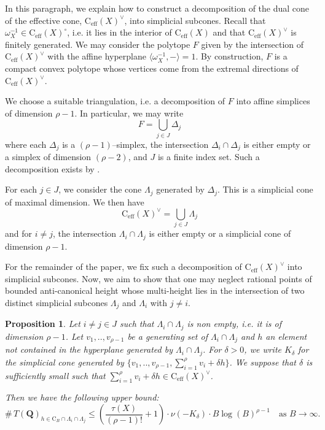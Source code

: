 \documentclass{proc-l}
\newcommand{\Q}{\mathbf{Q}}
\newcommand{\cone}{\text{C}_{\text{eff}}(X)}
\newcommand{\w}{\omega}
\newtheorem{prop}[theorem]{Proposition}
\theoremstyle{definition}
\theoremstyle{remark}
\numberwithin{equation}{section}
\begin{document}
In this paragraph, we explain how to construct a decomposition of the dual cone of the effective cone, $\cone^{\vee}$, into simplicial subcones. Recall that $\w_{X}^{-1} \in \cone^{\circ} $, i.e. it lies in the interior of $\cone$ and that $\cone^{\vee}$ is finitely generated. We may consider the polytope $F$ given by the intersection of $\cone^{\vee}$ with the affine hyperplane $\langle \w_{X}^{-1}, - \rangle = 1$. By construction, $F$ is a compact convex polytope whose vertices come from the extremal directions of $\cone^{\vee}$.

We choose a suitable triangulation, i.e. a decomposition of $F$ into affine simplices of dimension $\rho - 1$.  In particular, we may write
$$
F = \bigcup_{j \in J} \Delta_j
$$
where each $\Delta_j$ is a $(\rho-1)$–simplex, the intersection $\Delta_i \cap \Delta_j$ is either empty or a simplex of dimension $(\rho - 2)$, and $J$ is a finite index set. Such a decomposition exists by \cite[Chapter~2]{DeLoeraRambauSantosTriangulations}.

For each $j \in J$, we consider the cone $\Lambda_j$ generated by $\Delta_j$.  
This is a simplicial cone of maximal dimension.  
We then have
\begin{equation}\label{equation_decomposition_simplical_subcones}
    \cone^{\vee} = \bigcup_{j \in J} \Lambda_j
\end{equation}and for $i \neq j$, the intersection $\Lambda_i \cap \Lambda_j$ is either empty or a simplicial cone of dimension $\rho - 1$.






For the remainder of the paper, we fix such a decomposition of $\cone^{\vee}$ into simplicial subcones. Now, we aim to show that one may neglect rational points of bounded anti-canonical height whose multi-height lies in the intersection of two distinct simplicial subcones $\Lambda_j$ and $\Lambda_i$ with $j \neq i$.

\begin{prop}\label{proposition_majoration_cone_nombre_points_intersection}
    Let $i \neq j \in J$ such that $\Lambda_i \cap \Lambda_j$ is non empty, i.e. it is of dimension $\rho - 1$. Let $v_1,..,v_{\rho-1}$ be a generating set of $\Lambda_i \cap \Lambda_j$ and $h$ an element not contained in the hyperplane generated by $\Lambda_i \cap \Lambda_j$. For $\delta >0$, we write $K_{\delta}$ for the simplicial cone generated by $\{v_1,..,v_{\rho-1}, \sum\limits_{i = 1}^{\rho} v_i + \delta h \} $. We suppose that $\delta$ is sufficiently small such that $\sum\limits_{i = 1}^{\rho} v_i + \delta h \in \cone^{\vee}$.
    
    Then we have the following upper bound:
    \[
    \#\, T(\Q)_{h \in \mathrm{C}_B \cap \Lambda_i \cap \Lambda_{j}} \leqslant
    \left( \frac{\tau(X)}{(\rho - 1)!} + 1 \right) \cdot \nu(-K_{\delta}) \cdot B \log(B)^{\rho - 1} \quad \text{as } B \to \infty.
    \]
\end{prop}
\end{document}
